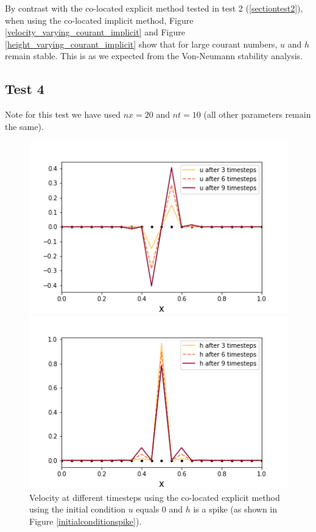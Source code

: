 \documentclass[a4paper,12pt, notitlepage]{article}
\begin{document}
By contrast with the co-located explicit method tested in test 2 (\ref{sectiontest2}), when using the co-located implicit method, Figure \ref{velocity_varying_courant_implicit} and Figure \ref{height_varying_courant_implicit} show that for large courant numbers, $u$ and $h$ remain stable. This is as we expected from the Von-Neumann stability analysis.

\subsection{Test 4}\label{subsectiontest4}

Note for this test we have used $nx = 20$ and $nt = 10$ (all other parameters remain the same).

\begin{figure} [H]
	\begin{minipage}{.5\textwidth}
		\ContinuedFloat*
		\captionsetup{width=0.9\textwidth}
		\captionsetup{justification=centering}
		\includegraphics[width=\textwidth]{velocity_colocated_explicit_spike.png}
		\caption{\label{velocity_colocated_explicit_spike} Velocity at different timesteps using the co-located explicit method using the initial condition $u$ equals 0 and $h$ is a spike (as shown in Figure \ref{initialconditionspike}).} 
	\end{minipage}
	\begin{minipage}{.5\textwidth}
		\ContinuedFloat
		\captionsetup{width=0.9\textwidth}
		\captionsetup{justification=centering}
		\includegraphics[width=\textwidth]{height_colocated_explicit_spike.png}

\end{minipage}
\end{figure}
\end{document}
